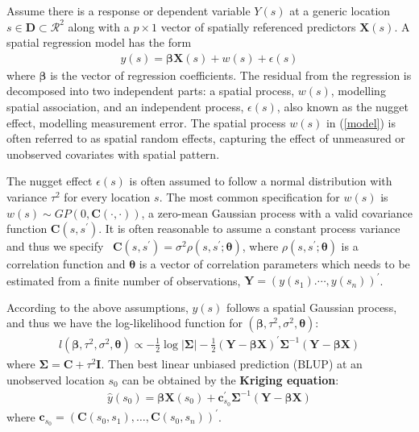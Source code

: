 \documentclass[
12pt, %
a4paper, %
oneside, %
headinclude,footinclude, %
BCOR5mm, %
]{scrartcl}
\begin{document}
Assume there is a response or dependent variable $Y(s)$ at a generic location $s \in \boldsymbol{D} \subset \mathcal{R}^2$ along with a $p \times 1$ vector of spatially referenced predictors $\boldsymbol{X}(s)$. A spatial regression model has the form
\begin{equation}
\begin{aligned}
y(s) = \boldsymbol{\beta}\boldsymbol{X}(s) + w(s) + \epsilon(s)
\end{aligned} \label{model}
\end{equation}
where $\boldsymbol{\beta}$ is the vector of regression coefficients. The residual from the regression is decomposed into two independent parts: a spatial process, $w(s)$, modelling spatial association, and an independent process, $\epsilon(s)$, also known as the nugget effect, modelling measurement error. The spatial process $w(s)$ in (\ref{model}) is often referred to as spatial random effects, capturing the effect of unmeasured or unobserved covariates with spatial pattern.

The nugget effect $\epsilon(s)$ is often assumed to follow a normal distribution with variance $\tau^2$ for every location $s$.
The most common specification for $w(s)$ is $w(s) \sim GP(0, \boldsymbol{C}(\cdot, \cdot))$, a zero-mean Gaussian process with a valid covariance function $\boldsymbol{C}(s, s^\prime)$. It is often reasonable to assume a constant process variance and thus we specify \
$\boldsymbol{C}(s, s^\prime) = \sigma^2 \rho (s, s^\prime; \boldsymbol{\theta})$, where $\rho (s, s^\prime; \boldsymbol{\theta})$ is a correlation function and $\boldsymbol{\theta}$ is a vector of correlation parameters which needs to be estimated from a finite number of observations, $\boldsymbol{Y} = \left(y(s_1). \cdots, y(s_n)\right)^\prime$.

According to the above assumptions, $y(s)$ follows a spatial Gaussian process, and thus we have the log-likelihood function for $(\boldsymbol{\beta}, \tau^2, \sigma^2, \boldsymbol{\theta}):$
\begin{equation}
\begin{aligned}
l(\boldsymbol{\beta}, \tau^2, \sigma^2, \boldsymbol{\theta}) \propto  - \frac{1}{2}\log |\boldsymbol{\Sigma}| - \frac{1}{2}\left(\boldsymbol{Y} - \boldsymbol{\beta}\boldsymbol{X}\right)^\prime \boldsymbol{\Sigma}^{- 1}\left(\boldsymbol{Y} - \boldsymbol{\beta}\boldsymbol{X}\right)
\end{aligned} \label{loglik}
\end{equation}
where $\boldsymbol{\Sigma} = \boldsymbol{C} + \tau^2\boldsymbol{I}.$
Then best linear unbiased prediction (BLUP) at an unobserved location $s_0$ can be obtained by the \textbf{Kriging
equation}:
\begin{equation}
\begin{aligned}
\hat{y}(s_0) = \boldsymbol{\beta}\boldsymbol{X}(s_0) + \boldsymbol{c}_{s_0}^\prime\boldsymbol{\Sigma}^{- 1}\left(\boldsymbol{Y} - \boldsymbol{\beta}\boldsymbol{X}\right)
\end{aligned} \label{Kriging}
\end{equation}
where $\boldsymbol{c}_{s_0} = \left(\boldsymbol{C}(s_0, s_1), \dots, \boldsymbol{C}(s_0, s_n)\right)^\prime$.
\end{document}
